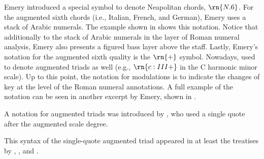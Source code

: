 

Emery introduced a special symbol to denote Neapolitan
chords, $\rn{N.6}$. For the augmented sixth chords (i.e.,
Italian, French, and German), Emery uses a stack of Arabic
numerals. The example shown in
 shows this
notation. Notice that additionally to the stack of Arabic
numerals in the layer of Roman numeral analysis, Emery also
presents a figured bass layer above the staff. Lastly,
Emery's notation for the augmented sixth quality is the
$\rn{+}$ symbol. Nowadays, used to denote augmented triads
as well (e.g., $\rn{c:III+}$ in the C harmonic minor scale).
Up to this point, the notation for modulations is to
indicate the changes of key at the level of the Roman
numeral annotations. A full example of the notation can be
seen in another excerpt by Emery, shown in
.


A notation for augmented triads was introduced by
\textcite{jadassohn1883lehrbuch}, who used a single quote
after the augmented scale degree.


This syntax of the single-quote augmented triad appeared in
at least the treatises by \textcite{broekhoven1889system},
\textcite{buwa1893schule}, and
\textcite{shepard1896harmony}.

